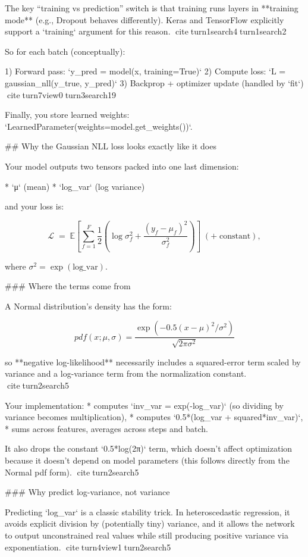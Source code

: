 \documentclass[a4paper]{article}
\begin{document}
    The key “training vs prediction” switch is that training runs layers in **training mode** (e.g., Dropout behaves differently). Keras and TensorFlow explicitly support a `training` argument for this reason. citeturn1search4turn1search2
    
    So for each batch (conceptually):
    
    1) Forward pass: `y_pred = model(x, training=True)`
    2) Compute loss: `L = gaussian_nll(y_true, y_pred)`
    3) Backprop + optimizer update (handled by `fit`) citeturn7view0turn3search19
    
    Finally, you store learned weights: `LearnedParameter(weights=model.get_weights())`.
    
    ## Why the Gaussian NLL loss looks exactly like it does
    
    Your model outputs two tensors packed into one last dimension:
    
    * `μ` (mean)
    * `log_var` (log variance)
    
    and your loss is:
    
    \[
    \mathcal{L} \;=\; \mathbb{E}\left[\sum_{f=1}^{F}\frac{1}{2}\left(\log \sigma_f^2 + \frac{(y_f-\mu_f)^2}{\sigma_f^2}\right)\right] \;(+\; \text{constant}),
    \]
    
    where \(\sigma^2 = \exp(\text{log\_var})\).
    
    ### Where the terms come from
    
    A Normal distribution’s density has the form:
    
    \[
    pdf(x;\mu,\sigma) = \frac{\exp(-0.5(x-\mu)^2/\sigma^2)}{\sqrt{2\pi\sigma^2}}
    \]
    
    so **negative log-likelihood** necessarily includes a squared-error term scaled by variance and a log-variance term from the normalization constant. citeturn2search5
    
    Your implementation:
    * computes `inv_var = exp(-log_var)` (so dividing by variance becomes multiplication),
    * computes `0.5*(log_var + squared*inv_var)`,
    * sums across features, averages across steps and batch.
    
    It also drops the constant `0.5*log(2π)` term, which doesn’t affect optimization because it doesn’t depend on model parameters (this follows directly from the Normal pdf form). citeturn2search5
    
    ### Why predict log-variance, not variance
    
    Predicting `log_var` is a classic stability trick. In heteroscedastic regression, it avoids explicit division by (potentially tiny) variance, and it allows the network to output unconstrained real values while still producing positive variance via exponentiation. citeturn4view1turn2search5
    
\end{document}
